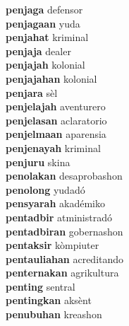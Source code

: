 \textbf{penjaga } defensor \\
\textbf{penjagaan } yuda \\
\textbf{penjahat } kriminal \\
\textbf{penjaja } dealer \\
\textbf{penjajah } kolonial \\
\textbf{penjajahan } kolonial \\
\textbf{penjara } sèl \\
\textbf{penjelajah } aventurero \\
\textbf{penjelasan } aclaratorio \\
\textbf{penjelmaan } aparensia \\
\textbf{penjenayah } kriminal \\
\textbf{penjuru } skina \\
\textbf{penolakan } desaprobashon \\
\textbf{penolong } yudadó \\
\textbf{pensyarah } akadémiko \\
\textbf{pentadbir } atministradó \\
\textbf{pentadbiran } gobernashon \\
\textbf{pentaksir } kòmpiuter \\
\textbf{pentauliahan } acreditando \\
\textbf{penternakan } agrikultura \\
\textbf{penting } sentral \\
\textbf{pentingkan } aksènt \\
\textbf{penubuhan } kreashon \\
